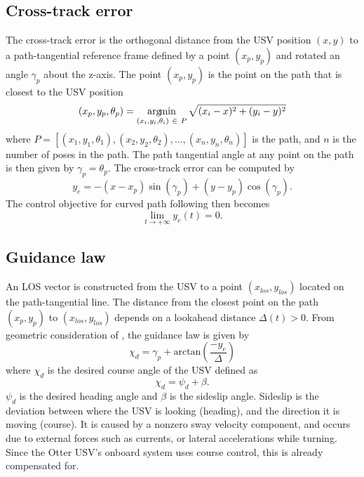\subsection{Cross-track error}

The cross-track error is the orthogonal distance from the USV position $(x,y)$ to a path-tangential reference frame defined by a point $(x_p,y_p)$ and rotated an angle $\gamma_p$ about the z-axis. The point $(x_p, y_p)$ is the point on the path that is closest to the USV position
\begin{equation}
(x_p,y_p,\theta_p) = \operatorname*{arg\!min}_{(x_i,y_i,\theta_i) \ \in \ P} \sqrt{(x_i - x)^2 + (y_i - y)^2}
\end{equation} 
where $P = [(x_1,y_1,\theta_1), (x_2,y_2,\theta_2), ... , (x_n,y_n,\theta_n)]$ is the path, and $n$ is the number of poses in the path. The path tangential angle at any point on the path is then given by $\gamma_p = \theta_p$. The cross-track error can be computed by
\begin{equation}
y_e = -(x - x_p)\sin(\gamma_p) + (y - y_p)\cos(\gamma_p).
\end{equation}
The control objective for curved path following then becomes
\begin{equation}
\lim_{t \to +\infty} y_e(t) = 0.
\end{equation}

\subsection{Guidance law}

An LOS vector is constructed from the USV to a point $(x_{los}, y_{los})$ located on the path-tangential line. The distance from the closest point on the path $(x_p,y_p)$ to $(x_{los},y_{los})$ depends on a lookahead distance $\Delta(t) > 0$. From geometric consideration of , the guidance law is given by
\begin{equation} \label{eq:guidance_law}
\chi_d = \gamma_p + \text{arctan}\left( \frac{-y_e}{\Delta} \right)
\end{equation}
where $\chi_d$ is the desired course angle of the USV defined as
\begin{equation}
\chi_d = \psi_d + \beta.
\end{equation} 
$\psi_d$ is the desired heading angle and $\beta$ is the sideslip angle. Sideslip is the deviation between where the USV is looking (heading), and the direction it is moving (course). It is caused by a nonzero sway velocity component, and occurs due to external forces such as currents, or lateral accelerations while turning. Since the Otter USV's onboard system uses course control, this is already compensated for.

